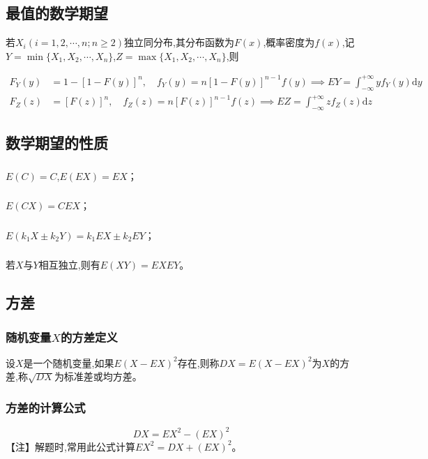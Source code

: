 \documentclass[UTF8]{ctexart}
\theoremstyle{remark}
\begin{document}
		\subsection{最值的数学期望}
		若\(X_i (i = 1,2,\cdots,n; n\geq2)\)独立同分布,其分布函数为\(F(x)\),概率密度为\(f(x)\),记\(Y = \min\{X_1,X_2,\cdots,X_n\}\),\(Z = \max\{X_1,X_2,\cdots,X_n\}\),则
		
		\begin{align*}
			F_Y(y)&=1 - [1 - F(y)]^n, \quad f_Y(y)=n[1 - F(y)]^{n - 1}f(y) \implies EY=\int_{-\infty}^{+\infty}yf_Y(y)\mathrm{d}y\\
			F_Z(z)&=[F(z)]^n, \quad f_Z(z)=n[F(z)]^{n - 1}f(z) \implies EZ=\int_{-\infty}^{+\infty}zf_Z(z)\mathrm{d}z
		\end{align*}
		
		
		\subsection{数学期望的性质}
		\subsubsection{}
		\(E(C)=C\),\(E(EX)=EX\)；
		\subsubsection{}
		\(E(CX)=CEX\)；
		\subsubsection{}
		\(E(k_1X \pm k_2Y)=k_1EX \pm k_2EY\)；
		\subsubsection{}
		若\(X\)与\(Y\)相互独立,则有\(E(XY)=EXEY\)。
		
		\subsection{方差}
		\subsubsection{随机变量\(X\)的方差定义}
		设\(X\)是一个随机变量,如果\(E(X - EX)^2\)存在,则称\(DX = E(X - EX)^2\)为\(X\)的方差,称\(\sqrt{DX}\)为标准差或均方差。
		
		\subsubsection{方差的计算公式}
		\[DX = EX^2-(EX)^2\]
		【注】解题时,常用此公式计算\(EX^2 = DX+(EX)^2\)。
		
\end{document}
